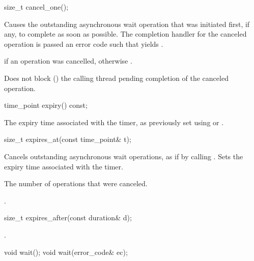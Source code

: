 \begin{itemdecl}
size_t cancel_one();
\end{itemdecl}

\begin{itemdescr}
\pnum
\effects Causes the outstanding asynchronous wait operation that was initiated first, if any, to complete as soon as possible. The completion handler for the canceled operation is passed an error code  such that  yields .

\pnum
\returns {} if an operation was cancelled, otherwise .

\pnum
\remarks Does not block () the calling thread pending completion of the canceled operation.
\end{itemdescr}

\begin{itemdecl}
time_point expiry() const;
\end{itemdecl}

\begin{itemdescr}
\pnum
\returns The expiry time associated with the timer, as previously set using  or .
\end{itemdescr}

\begin{itemdecl}
size_t expires_at(const time_point& t);
\end{itemdecl}

\begin{itemdescr}
\pnum
\effects Cancels outstanding asynchronous wait operations, as if by calling . Sets the expiry time associated with the timer.

\pnum
\returns The number of operations that were canceled.

\pnum
\postconditions {}.
\end{itemdescr}

\begin{itemdecl}
size_t expires_after(const duration& d);
\end{itemdecl}

\begin{itemdescr}
\pnum
\returns {}.
\end{itemdescr}

\begin{itemdecl}
void wait();
void wait(error_code& ec);
\end{itemdecl}

